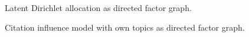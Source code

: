 \documentclass[a4paper]{article}
\begin{document}
\begin{figure}[ht]
  \begin{center}
    
  \end{center}
  \caption{Latent Dirichlet allocation as directed factor graph.}
\end{figure}

\begin{figure}[ht]
  \begin{center}
    
  \end{center}
  \caption{Citation influence model with own topics as directed factor
    graph.}
\end{figure}
\end{document}
